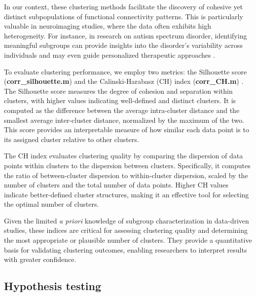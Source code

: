 \documentclass[10pt]{article}
\begin{document}
In our context, these clustering methods facilitate the discovery of cohesive yet distinct subpopulations of functional connectivity patterns. This is particularly valuable in neuroimaging studies, where the data often exhibits high heterogeneity. For instance, in research on autism spectrum disorder, identifying meaningful subgroups can provide insights into the disorder’s variability across individuals and may even guide personalized therapeutic approaches \citep{eaves_1994_SubtypesAutismCluster}.

To evaluate clustering performance, we employ two metrics: the Silhouette score (\textbf{corr\_silhouette.m}) \citep{rousseeuw_1987_RobustRegressionOutlier} and the Calinski-Harabasz (CH) index (\textbf{corr\_CH.m}) \citep{calinski_1974_DendriteMethodCluster}. The Silhouette score measures the degree of cohesion and separation within clusters, with higher values indicating well-defined and distinct clusters. It is computed as the difference between the average intra-cluster distance and the smallest average inter-cluster distance, normalized by the maximum of the two. This score provides an interpretable measure of how similar each data point is to its assigned cluster relative to other clusters.

The CH index evaluates clustering quality by comparing the dispersion of data points within clusters to the dispersion between clusters. Specifically, it computes the ratio of between-cluster dispersion to within-cluster dispersion, scaled by the number of clusters and the total number of data points. Higher CH values indicate better-defined cluster structures, making it an effective tool for selecting the optimal number of clusters.

Given the limited \textit{a priori} knowledge of subgroup characterization in data-driven studies, these indices are critical for assessing clustering quality and determining the most appropriate or plausible number of clusters. They provide a quantitative basis for validating clustering outcomes, enabling researchers to interpret results with greater confidence. 



\subsection{Hypothesis testing}
\end{document}
